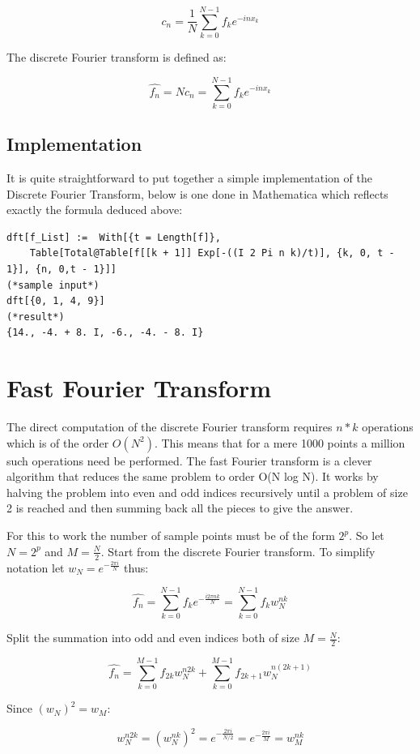 \documentclass[titlepage]{article}
\begin{document}
$$c_n = \frac{1}{N} \sum_{k=0}^{N-1} f_ke^{-i n x_k}$$

The discrete Fourier transform is defined as:

$$\hat{f_n} = Nc_n = \sum_{k=0}^{N-1} f_ke^{-i n x_k}$$

\subsection{Implementation}

It is quite straightforward to put together a simple implementation of the Discrete Fourier Transform, below is one done in Mathematica which reflects exactly the formula deduced above:

\begin{verbatim}
dft[f_List] :=  With[{t = Length[f]},  
	Table[Total@Table[f[[k + 1]] Exp[-((I 2 Pi n k)/t)], {k, 0, t - 1}], {n, 0,t - 1}]]
(*sample input*)
dft[{0, 1, 4, 9}]
(*result*)
{14., -4. + 8. I, -6., -4. - 8. I}
\end{verbatim}

\section{Fast Fourier Transform}

The direct computation of the discrete Fourier transform requires $n*k$ operations which is of the order $O(N^2)$. This means that for a mere 1000 points a million such operations need be performed. The fast Fourier transform is a clever algorithm that reduces the same problem to order O(N log N). It works by halving the problem into even and odd indices recursively until a problem of size 2 is reached and then summing back all the pieces to give the answer.

For this to work the number of sample points must be of the form $2^p$. So let $N=2^p$ and $M=\frac{N}{2}$. Start from the discrete Fourier transform. To simplify notation let $w_N = e^{-\frac{2\pi i}{N}}$ thus:

$$\hat{f_n} = \sum_{k=0}^{N-1} f_ke^{-\frac{i 2\pi n k}{N}}= \sum_{k=0}^{N-1} f_kw^{nk}_N$$

Split the summation into odd and even indices both of size $M=\frac{N}{2}$:

$$\hat{f_n} = \sum_{k=0}^{M-1} f_{2k}w^{n2k}_N + \sum_{k=0}^{M-1} f_{2k+1}w^{n(2k+1)}_N$$

Since $(w_N)^2 = w_M$:

$$w^{n2k}_N = (w^{nk}_N)^2 = e^{-\frac{2\pi i}{N/2}}=e^{-\frac{2\pi i}{M}}=w^{nk}_M$$
\end{document}

